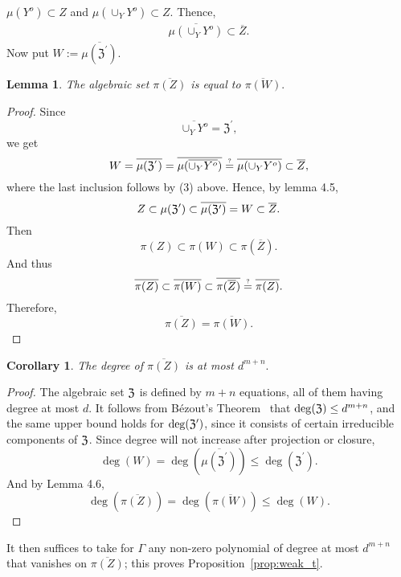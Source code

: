 \documentclass[a4paper]{article}
\newcommand\myeq{\mathrel{\stackrel{\makebox[0pt]{\mbox{\normalfont\tiny ?}}}{=}}}
\def\fZp{{\mathfrak Z^{'}}}
\newtheorem{corollary}[theorem]{Corollary}
\newtheorem{lemma}[theorem]{Lemma}
\begin{document}
    $\mu(Y^o) \subset Z$ and $\mu(\cup_Y Y^o) \subset Z.$ Thence, 
    \begin{align}
    \overline{\mu(\cup_Y Y^o)} \subset \overline{Z}.
    \end{align}
    Now put $W := \overline{\mu(\fZp)}$.
    \begin{lemma}
    The algebraic set $\overline{\pi(Z)}$ is equal to $\overline{\pi(W)}.$
    \end{lemma}
    \begin{proof}
    Since 
    \[
    \overline{\cup_Y Y^o} = \fZp,
    \]
    we get 
    \[
    W = \overline{\mu(\fZp)} = \overline{\mu(\overline{\cup_Y Y^o})}
    \myeq \overline{\mu(\cup_Y Y^o)} \subset \overline{Z},
    \]
    where the last inclusion follows by (3) above.
    Hence, by lemma 4.5,
    \[
    Z\subset\mu(\frak{Z}')\subset \overline{\mu(\frak{Z}')} = W \subset \overline{Z}.
    \]
    Then 
    \[
    \pi(Z) \subset \pi(W) \subset \pi(\overline{Z}).
    \]
    And thus
    \[
    \overline{\pi(Z)} \subset \overline{\pi(W)} \subset \overline{\pi(\overline{Z})} \myeq\overline{\pi(Z)}.
    \]
    Therefore,
    \[
    \overline{\pi(Z)} = \overline{\pi(W)}.
    \]
    \end{proof}
    \begin{corollary} 
      The degree of $\overline{\pi(Z)}$ is at most $d^{m+n}.$
    \end{corollary}
    \begin{proof}
      The algebraic set $\frak Z$ is defined by $m+n$ equations, all of
      them having degree at most $d$. It follows from B\'ezout's
      Theorem~\cite{H} that $\deg(\frak{Z}) \leq d^{m+n}$, and the same
      upper bound holds for $\deg(\frak{Z}')$, since it consists of
      certain irreducible components of $\frak Z$. Since degree will not increase after projection or closure, 
      \[
      \deg (W) = \deg( \overline{\mu(\fZp)}) \leq \deg(\fZp).
      \]
      And by Lemma 4.6,
      \[
      \deg(\overline{\pi(Z)})
      =
      \deg(\overline{\pi(W)})
      \leq
      \deg(W).
      \]
    \end{proof}
    \noindent
    It then suffices to take for $\Gamma$ any
    non-zero polynomial of degree at most $d^{m+n}$ that vanishes on
    $\overline{\pi(Z)}$; this proves Proposition~\ref{prop:weak_t}.


\end{document}
